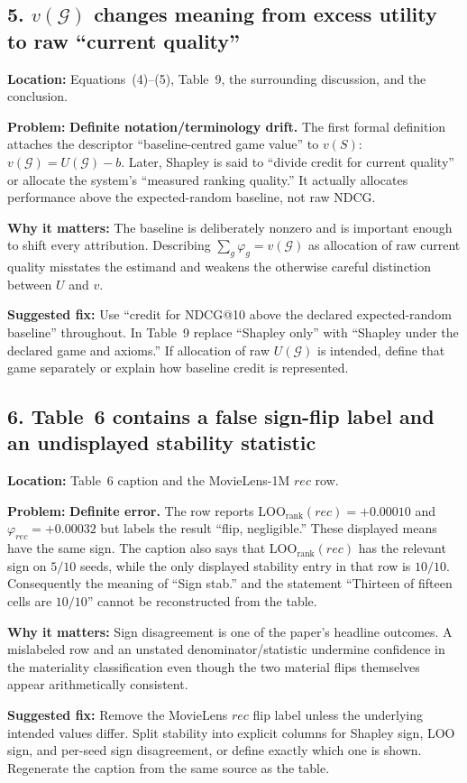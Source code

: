 \documentclass[11pt]{article}
\newcommand{\loc}[1]{\par\noindent\textbf{Location:} #1\par}
\newcommand{\problem}[1]{\noindent\textbf{Problem:} #1\par}
\newcommand{\impact}[1]{\noindent\textbf{Why it matters:} #1\par}
\newcommand{\fix}[1]{\noindent\textbf{Suggested fix:} #1\par}
\begin{document}
\subsection*{5. $v(\mathcal G)$ changes meaning from excess utility to raw ``current quality''}

\loc{Equations~(4)--(5), Table~9, the surrounding discussion, and the conclusion.}
\problem{\textbf{Definite notation/terminology drift.} The first formal definition attaches the descriptor ``baseline-centred game value'' to $v(S)$: $v(\mathcal G)=U(\mathcal G)-b$.  Later, Shapley is said to ``divide credit for current quality'' or allocate the system's ``measured ranking quality.''  It actually allocates performance above the expected-random baseline, not raw NDCG.}
\impact{The baseline is deliberately nonzero and is important enough to shift every attribution.  Describing $\sum_g\varphi_g=v(\mathcal G)$ as allocation of raw current quality misstates the estimand and weakens the otherwise careful distinction between $U$ and $v$.}
\fix{Use ``credit for NDCG@10 above the declared expected-random baseline'' throughout.  In Table~9 replace ``Shapley only'' with ``Shapley under the declared game and axioms.''  If allocation of raw $U(\mathcal G)$ is intended, define that game separately or explain how baseline credit is represented.}

\subsection*{6. Table~6 contains a false sign-flip label and an undisplayed stability statistic}

\loc{Table~6 caption and the MovieLens-1M $rec$ row.}
\problem{\textbf{Definite error.} The row reports $\mathrm{LOO}_{\mathrm{rank}}(rec)=+0.00010$ and $\varphi_{rec}=+0.00032$ but labels the result ``flip, negligible.''  These displayed means have the same sign.  The caption also says that $\mathrm{LOO}_{\mathrm{rank}}(rec)$ has the relevant sign on $5/10$ seeds, while the only displayed stability entry in that row is $10/10$.  Consequently the meaning of ``Sign stab.'' and the statement ``Thirteen of fifteen cells are $10/10$'' cannot be reconstructed from the table.}
\impact{Sign disagreement is one of the paper's headline outcomes.  A mislabeled row and an unstated denominator/statistic undermine confidence in the materiality classification even though the two material flips themselves appear arithmetically consistent.}
\fix{Remove the MovieLens $rec$ flip label unless the underlying intended values differ.  Split stability into explicit columns for Shapley sign, LOO sign, and per-seed sign disagreement, or define exactly which one is shown.  Regenerate the caption from the same source as the table.}
\end{document}
